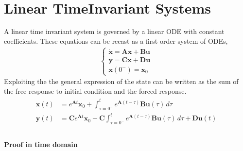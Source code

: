\documentclass[letterpaper,10pt,english]{jupyterBook}
\begin{document}
\sphinxstepscope


\chapter{Linear Time\sphinxhyphen{}Invariant Systems}
\label{\detokenize{ch/system-theory/lti:linear-time-invariant-systems}}\label{\detokenize{ch/system-theory/lti:ode-lti}}\label{\detokenize{ch/system-theory/lti::doc}}
\sphinxAtStartPar
A linear time invariant system is governed by a linear ODE with constant coefficients. These equations can be recast as a first order system of ODEs,
\begin{equation*}
\begin{split}\begin{cases}
  \dot{\mathbf{x}} = \mathbf{A} \mathbf{x} + \mathbf{B} \mathbf{u} \\
       \mathbf{y}  = \mathbf{C} \mathbf{x} + \mathbf{D} \mathbf{u} \\
  \mathbf{x}(0^-) = \mathbf{x}_0
\end{cases}\end{split}
\end{equation*}
\sphinxAtStartPar
Exploiting the {\hyperref[\detokenize{ch/system-theory/lti:ode-lti-matrix-properties}]{}} the general expression of the state can be written as the sum of the free response to initial condition and the forced response.
\begin{equation*}
\begin{split}\begin{aligned}
  \mathbf{x}(t) & = e^{\mathbf{A}t} \mathbf{x}_0 + \int_{\tau=0^-}^{t} e^{\mathbf{A}(t-\tau)} \mathbf{B} \mathbf{u} (\tau) \, d \tau \\
  \mathbf{y}(t) & = \mathbf{C} e^{\mathbf{A}t} \mathbf{x}_0 + \mathbf{C} \int_{\tau=0^-}^{t} e^{\mathbf{A}(t-\tau)} \mathbf{B} \mathbf{u} (\tau) \, d \tau  + \mathbf{D} \mathbf{u}(t) \\
\end{aligned}\end{split}
\end{equation*}\subsubsection*{Proof in time domain}
\end{document}

